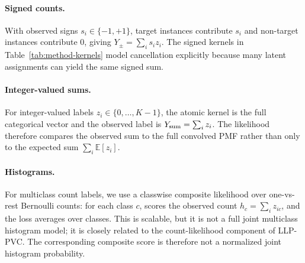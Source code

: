 \paragraph{Signed counts.}
With observed signs $s_i\in\{-1,+1\}$, target instances contribute $s_i$ and non-target instances contribute $0$, giving $Y_{\pm}=\sum_i s_i z_i$.
The signed kernels in Table~\ref{tab:method-kernels} model cancellation explicitly because many latent assignments can yield the same signed sum.

\paragraph{Integer-valued sums.}
For integer-valued labels $z_i\in\{0,\ldots,K-1\}$, the atomic kernel is the full categorical vector and the observed label is $Y_{\rm sum}=\sum_i z_i$.
The likelihood therefore compares the observed sum to the full convolved PMF rather than only to the expected sum $\sum_i\mathbb{E}[z_i]$.

\paragraph{Histograms.}
For multiclass count labels, we use a classwise composite likelihood over one-vs-rest Bernoulli counts: for each class $c$, \method{} scores the observed count $h_c=\sum_i z_{ic}$, and the loss averages over classes.
This is scalable, but it is not a full joint multiclass histogram model; it is closely related to the count-likelihood component of LLP-PVC.
The corresponding composite score is therefore not a normalized joint histogram probability.

\begin{table}[t]
\centering
\scriptsize
\caption{Task kernels used by \method{}.  The support order is the array order for the atomic PMF.}
\label{tab:method-kernels}
\end{table}

